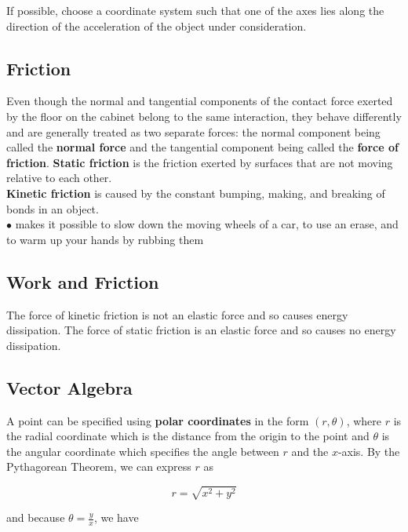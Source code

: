         If possible, choose a coordinate system such that one of the axes lies along the direction of the acceleration of the object under consideration.



    \subsection{Friction}

        Even though the normal and tangential components of the contact force exerted by the floor on the cabinet belong to the same interaction, they behave differently and are generally treated as two separate forces:
        the normal component being called the \textbf{normal force} and the tangential component being called the \textbf{force of friction}. \textbf{Static friction} is the friction exerted by surfaces that are not
        moving relative to each other. \\

        \textbf{Kinetic friction} is caused by the constant bumping, making, and breaking of bonds in an object. \\
        $\bullet$ makes it possible to slow down the moving wheels of a car, to use an erase, and to warm up your hands by rubbing them




    \subsection{Work and Friction}

        The force of kinetic friction is not an elastic force and so causes energy dissipation. The force of static friction is an elastic force and so causes no energy dissipation.



    \subsection{Vector Algebra}

        A point can be specified using \textbf{polar coordinates} in the form $(r,\theta)$, where $r$ is the radial coordinate which is the distance from the origin to the point and $\theta$ is the angular coordinate
        which specifies the angle between $r$ and the $x$-axis. By the Pythagorean Theorem, we can express $r$ as

        \[
            r = \sqrt{x^2+y^2}
        \]

        and because $\theta = \frac{y}{x}$, we have

